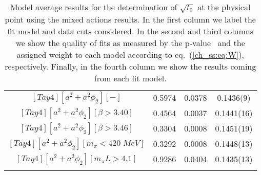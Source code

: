 \begin{longtable}{ c | c | c | c }
$[Tay4][a^2+a^2\phi_2][-]$ & 0.5974 & 0.0378 & 0.1436(9) \\
$[Tay4][a^2+a^2\phi_2][\beta>3.40]$ & 0.4564 & 0.0037 & 0.1441(16) \\
$[Tay4][a^2+a^2\phi_2][\beta>3.46]$ & 0.3304 & 0.0008 & 0.1451(19) \\
$[Tay4][a^2+a^2\phi_2][m_{\pi}<420\;MeV]$ & 0.3292 & 0.0008 & 0.1448(13) \\
$[Tay4][a^2+a^2\phi_2][m_{\pi}L>4.1]$ & 0.9286 & 0.0404 & 0.1435(13) \\
\bottomrule
\caption{Model average results for the determination of $\sqrt{t_0}$ at the physical point using the mixed actions results. In the first column we label the fit model and data cuts considered. In the second and third columns we show the quality of fits as measured by the p-value~\cite{chi_exp} and the assigned weight to each model according to eq.~(\ref{ch_ss:eq:W}), respectively. Finally, in the fourth column we show the results coming from each fit model.}
\end{longtable}

